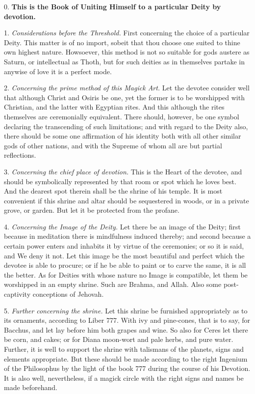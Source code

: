 



0. \textbf{This is the Book of Uniting Himself to a particular Deity by devotion.}

1. \textit{Considerations before the Threshold.} First concerning the choice of a particular Deity. This matter is of no import, sobeit that thou choose one suited to thine own highest nature. Howsoever, this method is not so suitable for gods austere as Saturn, or intellectual as Thoth, but for such deities as in themselves partake in anywise of love it is a perfect mode.

2. \textit{Concerning the prime method of this Magick Art.} Let the devotee consider well that although Christ and Osiris be one, yet the former is to be worshipped with Christian, and the latter with Egyptian rites. And this although the rites themselves are ceremonially equivalent. There should, however, be one symbol declaring the transcending of such limitations; and with regard to the Deity also, there should be some one affirmation of his identity both with all other similar gods of other nations, and with the Supreme of whom all are but partial reflections.

3. \textit{Concerning the chief place of devotion.} This is the Heart of the devotee, and should be symbolically represented by that room or spot which he loves best. And the dearest spot therein shall be the shrine of his temple. It is most convenient if this shrine and altar should be sequestered in woods, or in a private grove, or garden. But let it be protected from the profane.

4. \textit{Concerning the Image of the Deity.} Let there be an image of the Deity; first because in meditation there is mindfulness induced thereby; and second because a certain power enters and inhabits it by virtue of the ceremonies; or so it is said, and We deny it not. Let this image be the most beautiful and perfect which the devotee is able to procure; or if he be able to paint or to carve the same, it is all the better. As for Deities with whose nature no Image is compatible, let them be worshipped in an empty shrine. Such are Brahma, and Allah. Also some post-captivity conceptions of Jehovah.

5. \textit{Further concerning the shrine.} Let this shrine be furnished appropriately as to its ornaments, according to Liber 777. With ivy and pine-cones, that is to say, for Bacchus, and let lay before him both grapes and wine. So also for Ceres let there be corn, and cakes; or for Diana moon-wort and pale herbs, and pure water. Further, it is well to support the shrine with talismans of the planets, signs and elements appropriate. But these should be made according to the right Ingenium of the Philosophus by the light of the book 777 during the course of his Devotion. It is also well, nevertheless, if a magick circle with the right signs and names be made beforehand.


